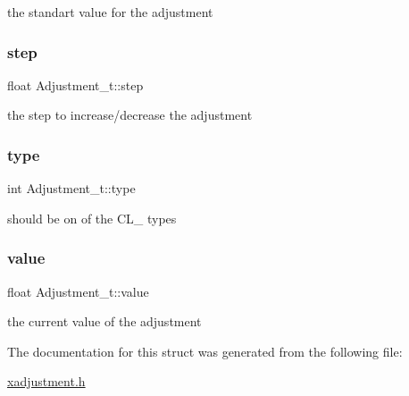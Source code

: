 the standart value for the adjustment \mbox{\label{structAdjustment__t_a0198d0a412f8642b3e8a308f9240d467}} 
\subsubsection{\texorpdfstring{step}{step}}
{\footnotesize\ttfamily float Adjustment\+\_\+t\+::step}

the step to increase/decrease the adjustment \mbox{\label{structAdjustment__t_a8d34edf1dfeaf75b7d22fb371c9c3b4a}} 
\subsubsection{\texorpdfstring{type}{type}}
{\footnotesize\ttfamily int Adjustment\+\_\+t\+::type}

should be on of the C\+L\+\_\+ types \mbox{\label{structAdjustment__t_acb1f8fb06d9e505f9f50e9178256215c}} 
\subsubsection{\texorpdfstring{value}{value}}
{\footnotesize\ttfamily float Adjustment\+\_\+t\+::value}

the current value of the adjustment 

The documentation for this struct was generated from the following file\+:\begin{DoxyCompactItemize}
\item 
\hyperlink{xadjustment_8h}{xadjustment.\+h}\end{DoxyCompactItemize}
